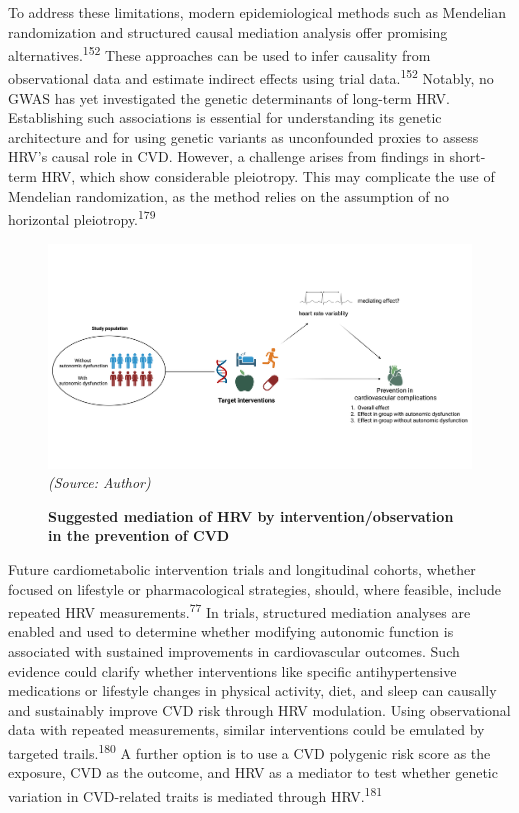 \documentclass[
  a4paper,
  headsepline=true,
  open=left]{scrbook}
\begin{document}
To address these limitations, modern epidemiological methods such as
Mendelian randomization and structured causal mediation analysis offer
promising alternatives.\textsuperscript{152} These approaches can be
used to infer causality from observational data and estimate indirect
effects using trial data.\textsuperscript{152} Notably, no GWAS has yet
investigated the genetic determinants of long-term HRV. Establishing
such associations is essential for understanding its genetic
architecture and for using genetic variants as unconfounded proxies to
assess HRV's causal role in CVD. However, a challenge arises from
findings in short-term HRV, which show considerable pleiotropy. This may
complicate the use of Mendelian randomization, as the method relies on
the assumption of no horizontal pleiotropy.\textsuperscript{179}

\begin{figure}

{\centering 

\includegraphics{images/Mediation_HRV_1.png} \emph{(Source: Author)}

}

\caption{\label{fig-mediation}\textbf{Suggested mediation of HRV by
intervention/observation in the prevention of CVD}}

\end{figure}

Future cardiometabolic intervention trials and longitudinal cohorts,
whether focused on lifestyle or pharmacological strategies, should,
where feasible, include repeated HRV measurements.\textsuperscript{77}
In trials, structured mediation analyses are enabled and used to
determine whether modifying autonomic function is associated with
sustained improvements in cardiovascular outcomes. Such evidence could
clarify whether interventions like specific antihypertensive medications
or lifestyle changes in physical activity, diet, and sleep can causally
and sustainably improve CVD risk through HRV modulation. Using
observational data with repeated measurements, similar interventions
could be emulated by targeted trails.\textsuperscript{180} A further
option is to use a CVD polygenic risk score as the exposure, CVD as the
outcome, and HRV as a mediator to test whether genetic variation in
CVD-related traits is mediated through HRV.\textsuperscript{181}
\end{document}
